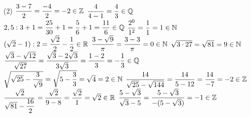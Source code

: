 \documentclass[a4paper,12pt]{report}
\begin{document}
\begin{core}
	\phantom{}
\begin{tasks}(2)
	\task $\dfrac{3-7}{2}=\dfrac{-4}{2}=-2\in \mathbb Z$
	\task $\dfrac{4}{4-1}=\dfrac{4}{3}\in \mathbb Q$
	\task $2,5: 3+1=\dfrac{25}{30}+1=\dfrac{5}{6}+1=\dfrac{11}{6}\in\mathbb Q$
	\task $\dfrac{2^0}{1^2}=\dfrac{1}{1}=1\in \mathbb N$
	\task $(\sqrt{2}-1): 2=\dfrac{\sqrt{2}}{2}-\dfrac{1}{2}\in\mathbb R$
	\task $\dfrac{3-\sqrt{9}}{\pi}=\dfrac{3-3}{\pi}=0\in \mathbb N$
	\task $\sqrt{3 \cdot 27}=\sqrt{81}=9\in \mathbb N$
	\task $\dfrac{\sqrt{3}-\sqrt{12}}{\sqrt{27}}=\dfrac{\sqrt{3}-2\sqrt{3}}{3\sqrt{3}}=\dfrac{1-2}{3}=-\dfrac{1}{3}\in\mathbb Q$
	\task $\sqrt{\sqrt{25}-\dfrac{3}{\sqrt{9}}}=\sqrt{5-\dfrac{3}{3}}=\sqrt{4}=2\in \mathbb N$
	\task $\dfrac{14}{\sqrt{25}-\sqrt{144}}=\dfrac{14}{5-12}=\dfrac{14}{-7}=-2\in\mathbb Z$
	\task $\dfrac{\sqrt{2}}{\sqrt{81}-\dfrac{16}{2}}=\dfrac{\sqrt{2}}{9-8}=\dfrac{\sqrt{2}}{1}=\sqrt{2}\in \mathbb R$
	\task $\dfrac{5-\sqrt{3}}{\sqrt{3}-5}=\dfrac{5-\sqrt{3}}{-(5-\sqrt{3})}=-1\in \mathbb Z$
\end{tasks} 
\end{core}
\end{document}
